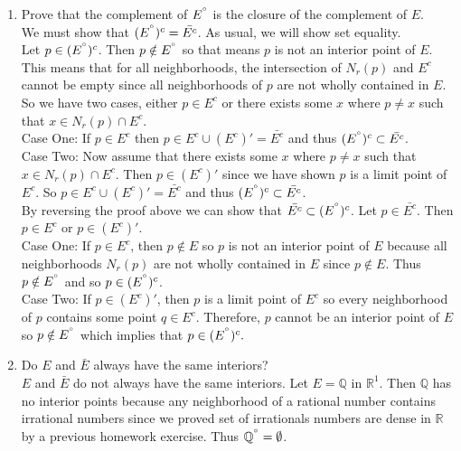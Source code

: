 \documentclass[12pt]{article}
\begin{document}
\begin{enumerate}
\item Prove that the complement of $E^{\degree}$ is the closure of the complement of $E$. \\ 

We must show that $(E^{\degree})^{c}=\bar{E^{c}}$. As usual, we will show set equality. \\ 

Let $p \in (E^{\degree})^{c}$. Then $p \notin E^{\degree}$ so that means $p$ is not an interior point of $E$. This means that for all neighborhoods, the intersection of $N_{r}(p)$ and $E^{c}$ cannot be empty since all neighborhoods of $p$ are not wholly contained in $E$. So we have two cases, either $p \in E^{c}$ or there exists some $x$ where $p \neq x$ such that $x \in N_{r}(p) \cap E^{c}$. \\

Case One: If $p \in E^{c}$ then $p \in  E^{c} \cup (E^{c})' = \bar{E^{c}}$ and thus $(E^{\degree})^{c} \subset \bar{E^{c}}$. \\

Case Two: Now assume that there exists some $x$ where $p \neq x$ such that $x \in N_{r}(p) \cap E^{c}$. Then $p \in (E^{c})'$ since we have shown $p$ is a limit point of $E^{c}$. So $p \in  E^{c} \cup (E^{c})' = \bar{E^{c}}$ and thus $(E^{\degree})^{c} \subset \bar{E^{c}}$. \\

By reversing the proof above we can show that $\bar{E^{c}} \subset (E^{\degree})^{c}$. Let $p \in \bar{E^{c}}$. Then $p \in E^{c}$ or $p \in (E^{c})'$. \\ 

Case One: If $p \in E^{c}$, then $p \notin E$ so $p$ is not an interior point of $E$ because all neighborhoods $N_{r}(p)$ are not wholly contained in $E$ since $p \notin E$. Thus $p \notin E^{\degree}$ and so $p \in (E^{\degree})^{c}$. \\

Case Two: If $p \in (E^{c})'$, then $p$ is a limit point of $E^{c}$ so every neighborhood of $p$ contains some point $q \in E^{c}$. Therefore, $p$ cannot be an interior point of $E$ so $p \notin E^{\degree}$ which implies that $p \in (E^{\degree})^{c}.$  \\ 

\item Do $E$ and $\bar{E}$ always have the same interiors? \\ 

$E$ and $\bar{E}$ do not always have the same interiors. Let $E= \mathbb{Q}$ in $\mathbb{R}^{1}$. Then $\mathbb{Q}$ has no interior points because any neighborhood of a rational number contains irrational numbers since we proved set of irrationals numbers are dense in $\mathbb{R}$ by a previous homework exercise. Thus $\mathbb{Q}^{\degree} = \emptyset$. \\ 


\end{enumerate}
\end{document}
